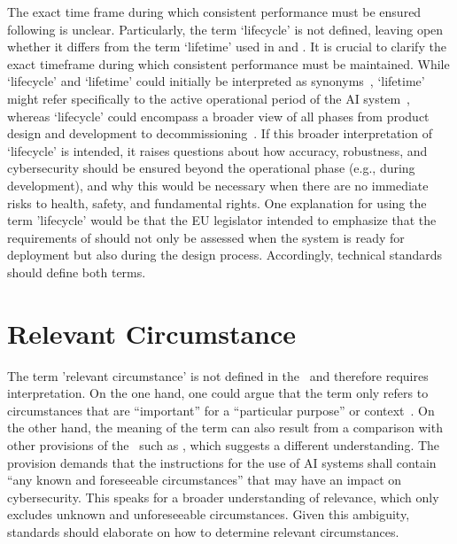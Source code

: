 The exact time frame during which consistent performance must be 
ensured following  is unclear. Particularly, the term `lifecycle' is not defined, leaving open whether it differs from the term `lifetime' used in  and .
%
It is crucial to clarify the exact timeframe during which consistent performance must be maintained.
% 
While `lifecycle' and `lifetime' could initially be interpreted as synonyms~\cite{marcus2020promoting}, `lifetime' might refer specifically to the active operational period of the AI system~\cite{murakami2010lifespan}, whereas `lifecycle' could encompass a broader view of all phases from product design and development to decommissioning~\cite{hamon2024three}. If this broader interpretation of `lifecycle' is intended, it raises questions about how accuracy, robustness, and cybersecurity should be ensured beyond the operational phase (e.g., during development), and why this would be necessary when there are no immediate risks to health, safety, and fundamental rights. One explanation for using the term 'lifecycle' would be that the EU legislator intended to emphasize that the requirements of  should not only be assessed when the system is ready for deployment but also during the design process. Accordingly, technical standards should define both terms.



\section{Relevant Circumstance }\label{apx:relevant-circumstances}

The term 'relevant circumstance' is not defined in the \EUAIAct\ and therefore requires interpretation.
%
On the one hand, one could argue that the term only refers to circumstances 
that are ``important'' for a ``particular purpose'' or context~\cite{CambridgeRelevant}.
%
On the other hand, the meaning of the term can also result from a comparison with other provisions of the \EUAIAct\ such as , which suggests a different understanding. 
%
The provision demands that the instructions for the use of AI systems shall contain ``any known and foreseeable circumstances'' that may have an impact on cybersecurity. 
%
This speaks for a broader understanding of relevance, which only excludes unknown and unforeseeable circumstances.
%
Given this ambiguity, standards should elaborate on how to determine relevant circumstances.



